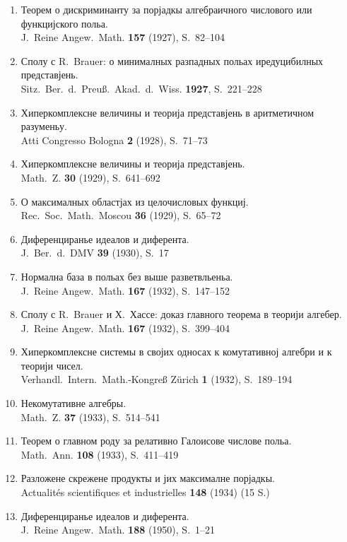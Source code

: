 ﻿\documentclass[11pt]{article}
\newcommand{\foreign}[1]{#1}
\begin{document}
\begin{enumerate}[label={\small\arabic*.},leftmargin=2em,itemsep=0.3em]
\item Теорем о дискриминанту за порјадкы алгебраичного числового или функцијского польа.\\
\foreign{J.\ Reine Angew.\ Math.} \textbf{157} (1927), S.~82--104

\item Сполу с R.\ Brauer: о минималных разпадных польах иредуцибилных представјень.\\
\foreign{Sitz.\ Ber.\ d.\ Preuß.\ Akad.\ d.\ Wiss.} \textbf{1927}, S.~221--228

\item Хиперкомплексне величины и теорија представјень в аритметичном разуменьу.\\
\foreign{Atti Congresso Bologna} \textbf{2} (1928), S.~71--73

\item Хиперкомплексне величины и теорија представјень.\\
\foreign{Math.\ Z.} \textbf{30} (1929), S.~641--692

\item О максималных областјах из целочисловых функциј.\\
\foreign{Rec.\ Soc.\ Math.\ Moscou} \textbf{36} (1929), S.~65--72

\item Диференциранье идеалов и диферента.\\
\foreign{J.\ Ber.\ d.\ DMV} \textbf{39} (1930), S.~17

\item Нормална база в польах без выше разветвльеньа.\\
\foreign{J.\ Reine Angew.\ Math.} \textbf{167} (1932), S.~147--152

\item Сполу с R.\ Brauer и Х.\ Хассе: доказ главного теорема в теорији алгебер.\\
\foreign{J.\ Reine Angew.\ Math.} \textbf{167} (1932), S.~399--404

\item Хиперкомплексне системы в својих односах к комутативној алгебри и к теорији чисел.\\
\foreign{Verhandl.\ Intern.\ Math.-Kongreß Zürich} \textbf{1} (1932), S.~189--194

\item Некомутативне алгебры.\\
\foreign{Math.\ Z.} \textbf{37} (1933), S.~514--541

\item Теорем о главном роду за релативно Галоисове числове польа.\\
\foreign{Math.\ Ann.} \textbf{108} (1933), S.~411--419

\item Разложене скрежене продукты и јих максималне порјадкы.\\
\foreign{Actualités scientifiques et industrielles} \textbf{148} (1934) (15 S.)

\item Диференциранье идеалов и диферента.\\
\foreign{J.\ Reine Angew.\ Math.} \textbf{188} (1950), S.~1--21
\end{enumerate}
\end{document}
